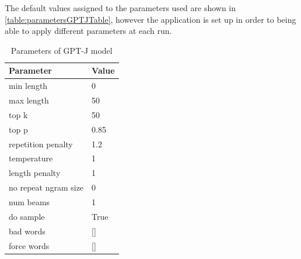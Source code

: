 The default values assigned to the parameters used are shown in \autoref{table:parametersGPTJTable}, however the application is set up in order to being able to apply different parameters at each run.

\begin{table}[h] 
\centering
\begin{tabular}{|l|l|}
\hline
Parameter          & Value \\ \hline
min length         & 0    \\ 
max length         & 50    \\ 
top k              & 50    \\
top p              & 0.85  \\
repetition penalty & 1.2   \\
temperature        & 1     \\
length penalty     & 1     \\
no repeat ngram size     & 0     \\
num beams &  1 \\
do sample & True \\
bad words & [\space] \\
force words & [\space] \\ \hline
\end{tabular}
\caption{Parameters of GPT-J model}\label{table:parametersGPTJTable}
\end{table}
